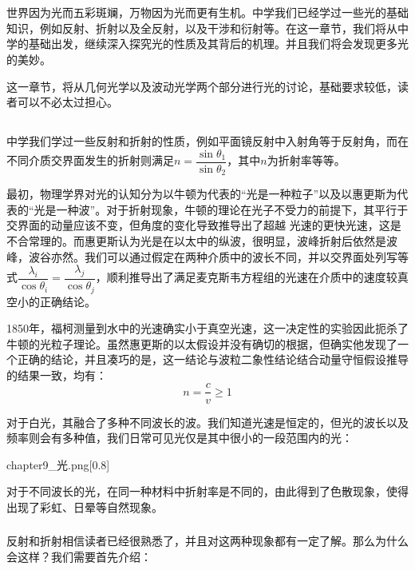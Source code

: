 \chapter[光学]{}
世界因为光而五彩斑斓，万物因为光而更有生机。中学我们已经学过一些光的基础知识，例如反射、折射以及全反射，以及干涉和衍射等。在这一章节，我们将从中学的基础出发，继续深入探究光的性质及其背后的机理。并且我们将会发现更多光的美妙。

这一章节，将从几何光学以及波动光学两个部分进行光的讨论，基础要求较低，读者可以不必太过担心。
\section[几何光学]{}
\subsection[导论]{}
中学我们学过一些反射和折射的性质，例如平面镜反射中入射角等于反射角，而在不同介质交界面发生的折射则满足$n=\dfrac{\sin\theta_1}{\sin\theta_2}$，其中$n$为折射率等等。

最初，物理学界对光的认知分为以牛顿为代表的“光是一种粒子”以及以惠更斯为代表的“光是一种波”。对于折射现象，牛顿的理论在光子不受力的前提下，其平行于交界面的动量应该不变，但角度的变化导致推导出了超越
光速的更快光速，这是不合常理的。而惠更斯认为光是在以太中的纵波，很明显，波峰折射后依然是波峰，波谷亦然。我们可以通过假定在两种介质中的波长不同，并以交界面处列写等式$\dfrac{\lambda_i}{\cos\theta_i}=\dfrac{\lambda_j}{\cos\theta_j}$，顺利推导出了满足麦克斯韦方程组的光速在介质中的速度较真空小的正确结论。

1850年，福柯测量到水中的光速确实小于真空光速，这一决定性的实验因此扼杀了牛顿的光粒子理论。虽然惠更斯的以太假设并没有确切的根据，但确实他发现了一个正确的结论，并且凑巧的是，这一结论与波粒二象性结论结合动量守恒假设推导的结果一致，均有：
\[n=\dfrac{c}{v}\geq 1\]

对于白光，其融合了多种不同波长的波。我们知道光速是恒定的，但光的波长以及频率则会有多种值，我们日常可见光仅是其中很小的一段范围内的光：
\begin{singlefigure}[光]{chapter9_光.png}[0.8]
\end{singlefigure}

对于不同波长的光，在同一种材料中折射率是不同的，由此得到了色散现象，使得出现了彩虹、日晕等自然现象。
\subsection[反射和折射]{}
反射和折射相信读者已经很熟悉了，并且对这两种现象都有一定了解。那么为什么会这样？我们需要首先介绍：

